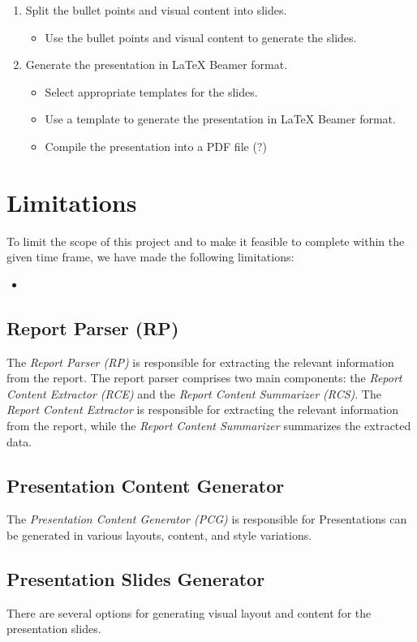 \begin{enumerate}
\item Split the bullet points and visual content into slides.
    \begin{itemize}
        \item Use the bullet points and visual content to generate the slides.
    \end{itemize}

\item Generate the presentation in \LaTeX{} Beamer format.
    \begin{itemize}
        \item Select appropriate templates for the slides.
        \item Use a template to generate the presentation in \LaTeX{} Beamer format.
        \item Compile the presentation into a PDF file (?)
    \end{itemize}
\end{enumerate}

\section{Limitations}
To limit the scope of this project and to make it feasible to complete within the given time frame, we have made the following limitations:
\begin{itemize}
    \item 
\end{itemize}

\subsection{Report Parser (RP)}
The \emph{Report Parser (RP)} is responsible for extracting the relevant information from the report. The report parser comprises two main components: the \emph{Report Content Extractor (RCE)} and the \emph{Report Content Summarizer (RCS)}. The \emph{Report Content Extractor} is responsible for extracting the relevant information from the report, while the \emph{Report Content Summarizer} summarizes the extracted data.

\subsection{Presentation Content Generator}
The \emph{Presentation Content Generator (PCG)} is responsible for 
Presentations can be generated in various layouts, content, and style variations. 

\subsection{Presentation Slides Generator}
There are several options for generating visual layout and content for the presentation slides. 

